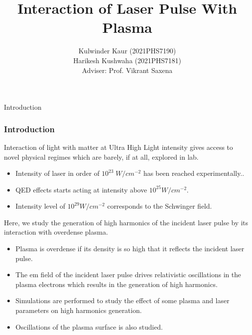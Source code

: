 \documentclass{beamer}
\title[Interaction of Laser Pulse With Plasma]{Interaction of Laser Pulse With Plasma}
\date{}
\institute[IIT Delhi]{\large Indian Institute of Technology, Delhi}
\author[]{Kulwinder Kaur (2021PHS7190)\\ Harikesh Kushwaha (2021PHS7181)\\[3mm]Adviser: Prof. Vikrant Saxena}
\begin{document}
\maketitle
\begin{frame}{Introduction}
    \frametitle{Introduction}
    \small
    Interaction of light with matter at Ultra High Light intensity gives access to novel physical regimes which are barely, if at all, explored in lab.\cite{henri}
    \begin{itemize}
        \item Intensity of laser in order of $10^{23} \; W/cm^{-2}$ has been reached experimentally.\cite{highintensity}.
        \item QED effects starts acting at intensity above $10^{25}W/cm^{-2}$.
        \item Intensity level of $10^{29}W/cm^{-2}$ corresponds to the Schwinger field.
    \end{itemize}
    Here, we study the generation of high harmonics of the incident laser pulse by its interaction with overdense plasma.

    \begin{itemize}
        \item Plasma is overdense if its density is so high that it reflects the incident laser pulse.
        \item The em field of the incident laser pulse drives relativistic oscillations in the plasma electrons which results in the generation of high harmonics.
        \item Simulations are performed to study the effect of some plasma and laser parameters on high harmonics generation.
        \item Oscillations of the plasma surface is also studied.
    \end{itemize}



\end{frame}
\end{document}
